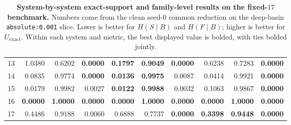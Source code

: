 \begin{table}[ht]
\begin{tabular}{r rrr rrr rrr}
13 & 1.0380 & 0.6202 & \textbf{0.0000} & \textbf{0.1797} & \textbf{0.9049} & \textbf{0.0000} & 0.6238 & 0.7283 & \textbf{0.0000} \\
14 & 0.0835 & 0.9774 & \textbf{0.0000} & \textbf{0.0136} & \textbf{0.9975} & 0.0087 & 0.0414 & 0.9921 & \textbf{0.0000} \\
15 & 0.0179 & 0.9982 & 0.0027 & \textbf{0.0122} & \textbf{0.9988} & 0.0032 & 0.1063 & 0.9867 & \textbf{0.0000} \\
16 & \textbf{0.0000} & \textbf{1.0000} & \textbf{0.0000} & \textbf{0.0000} & \textbf{1.0000} & \textbf{0.0000} & \textbf{0.0000} & \textbf{1.0000} & \textbf{0.0000} \\
17 & 0.4486 & 0.9188 & 0.0060 & 0.6888 & 0.7737 & \textbf{0.0000} & \textbf{0.3398} & \textbf{0.9448} & \textbf{0.0000} \\
\bottomrule
\end{tabular}
\caption{\textbf{System-by-system exact-support and family-level results on the fixed-$17$ benchmark.} Numbers come from the clean seed-$0$ common reduction on the deep-basin \texttt{absolute:0.001} slice. Lower is better for $H(S \mid B)$ and $H(F \mid B)$; higher is better for $U_{\mathrm{exact}}$. Within each system and metric, the best displayed value is bolded, with ties bolded jointly.}
\label{tab:fixed17-system-exact}
\end{table}

